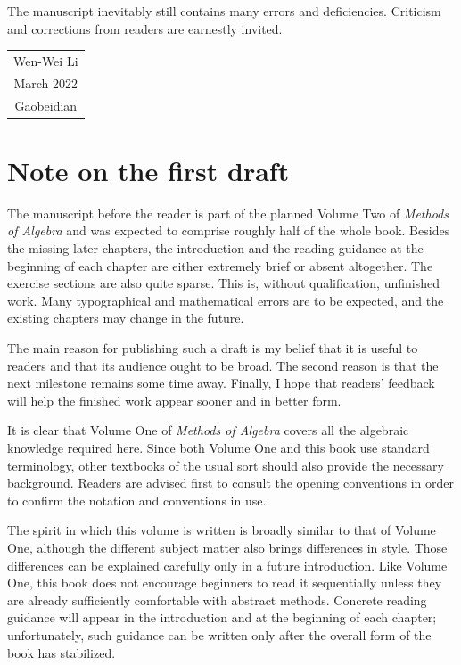 The manuscript inevitably still contains many errors and deficiencies.
Criticism and corrections from readers are earnestly invited.

\vspace{1em}
\begin{flushright}\begin{minipage}{0.3 \textwidth}
  \begin{tabular}{c}
    Wen-Wei Li \\
    March 2022 \\
    Gaobeidian
  \end{tabular}
\end{minipage}\end{flushright}
\vspace{1em}

\section*{Note on the first draft}

The manuscript before the reader is part of the planned Volume Two of
\emph{Methods of Algebra} and was expected to comprise roughly half of the
whole book. Besides the missing later chapters, the introduction and the
reading guidance at the beginning of each chapter are either extremely brief
or absent altogether. The exercise sections are also quite sparse. This is,
without qualification, unfinished work. Many typographical and mathematical
errors are to be expected, and the existing chapters may change in the future.

The main reason for publishing such a draft is my belief that it is useful to
readers and that its audience ought to be broad. The second reason is that the
next milestone remains some time away. Finally, I hope that readers' feedback
will help the finished work appear sooner and in better form.

It is clear that Volume One of \emph{Methods of Algebra} covers all the
algebraic knowledge required here. Since both Volume One and this book use
standard terminology, other textbooks of the usual sort should also provide
the necessary background. Readers are advised first to consult the opening
conventions in order to confirm the notation and conventions in use.

The spirit in which this volume is written is broadly similar to that of
Volume One, although the different subject matter also brings differences in
style. Those differences can be explained carefully only in a future
introduction. Like Volume One, this book does not encourage beginners to read
it sequentially unless they are already sufficiently comfortable with
abstract methods. Concrete reading guidance will appear in the introduction
and at the beginning of each chapter; unfortunately, such guidance can be
written only after the overall form of the book has stabilized.

